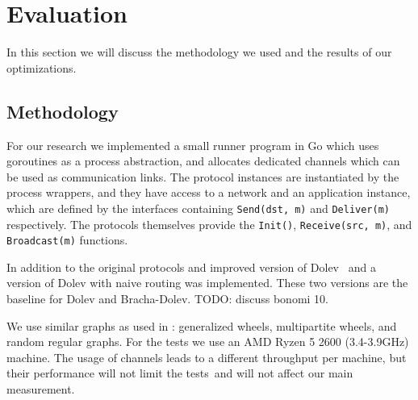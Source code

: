 \section{Evaluation}
\label{eval}



In this section we will discuss the methodology we used and the results of our optimizations.

\subsection{Methodology}
For our research we implemented a small runner program in Go which uses goroutines as a process abstraction, and allocates dedicated channels which can be used as communication links. The protocol instances are instantiated by the process wrappers, and they have access to a network and an application instance, which are defined by the interfaces containing \texttt{Send(dst, m)} and \texttt{Deliver(m)} respectively. The protocols themselves provide the \texttt{Init()}, \texttt{Receive(src, m)}, and \texttt{Broadcast(m)} functions.

In addition to the original protocols and improved version of Dolev~\cite{bonomi2019multihop} and a version of Dolev with naive routing was implemented. These two versions are the baseline for Dolev and Bracha-Dolev. 
TODO: discuss bonomi 10.

We use similar graphs as used in \cite{bonomi2019multihop,bonomi2021practical}: generalized wheels, multipartite wheels, and random regular graphs. For the tests we use an AMD Ryzen 5 2600 (3.4-3.9GHz) machine. The usage of channels leads to a different throughput per machine, but their performance will not limit the tests~\citationneeded and will not affect our main measurement.

